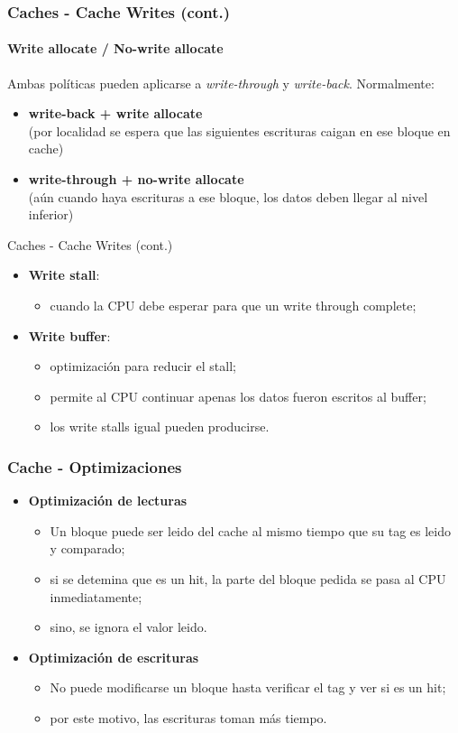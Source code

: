 \documentclass{beamer}
\begin{document}
    \begin{frame}
    \frametitle{Caches - Cache Writes (cont.)}
    \framesubtitle{Write allocate / No-write allocate}
      Ambas políticas pueden aplicarse a \emph{write-through} y \emph{write-back}. Normalmente:
	\bigskip
	\begin{itemize}
	  \item \textbf{write-back + write allocate} \\
	  (por localidad se espera que las siguientes escrituras caigan en ese
	  bloque en cache)
	  \bigskip
	  \item \textbf{write-through + no-write allocate} \\
	  (aún cuando haya escrituras a ese bloque, los datos deben llegar al
	  nivel inferior)
	\end{itemize}
  \end{frame}

  \begin{frame}{Caches - Cache Writes (cont.)}
    \begin{itemize}
      \item \textbf{Write stall}:
      \begin{itemize}
        \item cuando la CPU debe esperar para que un write through complete;
      \end{itemize}
    \bigskip
      \item \textbf{Write buffer}:
      \begin{itemize}
        \item optimización para reducir el stall;
	\item permite al CPU continuar apenas los datos fueron escritos al
	buffer;
	\item los write stalls igual pueden producirse.
      \end{itemize}
    \end{itemize}
  \end{frame}

  \begin{frame}
  \frametitle{Cache - Optimizaciones}
    \begin{itemize}
      \item \textbf{Optimización de lecturas}
      \begin{itemize}
        \item Un bloque puede ser leido del cache al mismo tiempo que su tag es
        leido y comparado;
	\item si se detemina que es un hit, la parte del bloque pedida se pasa
	al CPU inmediatamente;
        \item sino, se ignora el valor leido.
      \end{itemize}
\bigskip
      \item \textbf{Optimización de escrituras}
      \begin{itemize}
        \item No puede modificarse un bloque hasta verificar el tag y ver si es
	un hit;
	\item por este motivo, las escrituras toman más tiempo.
      \end{itemize}
    \end{itemize}
  \end{frame}
\end{document}
